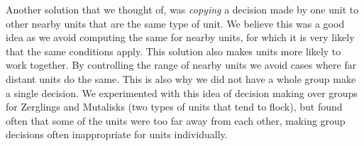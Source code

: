 Another solution that we thought of, was \emph{copying} a decision made by one unit to other nearby units that are the same type of unit. We believe this was a good idea as we avoid computing the same for nearby units, for which it is very likely that the same conditions apply. This solution also makes units more likely to work together. By controlling the range of nearby units we avoid cases where far distant units do the same. This is also why we did not have a whole group make a single decision. We experimented with this idea of decision making over groups for Zerglings and Mutalisks (two types of units that tend to flock), but found often that some of the units were too far away from each other, making group decisions often inappropriate for units individually.










